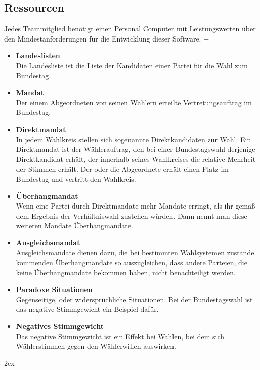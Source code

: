 \documentclass[10pt,a4paper]{article}
\begin{document}
\subsection{Ressourcen}
Jedes Teammitglied benötigt einen Personal Computer mit Leistungswerten über den Mindestanforderungen für die Entwicklung dieser Software.
+
\begin{itemize}
	\item \textbf{Landeslisten} \\
		Die Landesliste ist die Liste der Kandidaten einer Partei für die Wahl zum Bundestag.
	\item \textbf{Mandat} \\
	Der einem Abgeordneten von seinen Wählern erteilte Vertretungsauftrag im Bundestag.
	\item \textbf{Direktmandat} \\
	In jedem Wahlkreis stellen sich sogenannte Direktkandidaten zur Wahl. Ein Direktmandat ist der Wählerauftrag, den bei einer Bundestagswahl derjenige Direktkandidat erhält, der innerhalb seines Wahlkreises die relative Mehrheit der Stimmen erhält. Der oder die Abgeordnete erhält einen Platz im Bundestag und vertritt den Wahlkreis.
	\item \textbf{Überhangmandat} \\
	Wenn eine Partei durch Direktmandate mehr Mandate erringt, als ihr gemäß dem Ergebnis der Verhältniswahl zustehen würden. Dann nennt man diese weiteren Mandate Überhangmandate.
	\item \textbf{Ausgleichsmandat} \\
	Ausgleichsmandate dienen dazu, die bei bestimmten Wahlsystemen zustande kommenden Überhangmandate so auszugleichen, dass andere Parteien, die keine Überhangmandate bekommen haben, nicht benachteiligt werden.
	\item \textbf{Paradoxe Situationen} \\
	Gegenseitige, oder widersprüchliche Situationen. Bei der Bundestagswahl ist das negative Stimmgewicht ein Beispiel dafür.
	\item \textbf{Negatives Stimmgewicht} \\
	Das negative Stimmgewicht ist ein Effekt bei Wahlen, bei dem sich Wählerstimmen gegen den Wählerwillen auswirken.
	
	
\end{itemize}

\renewcommand{\notesname}{15 Glossar}


\begingroup
\parindent 0pt
\parskip 2ex
\def\enotesize{\normalsize}
\theendnotes
\endgroup
\end{document}
